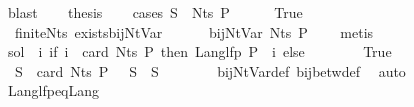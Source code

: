 \begin{isabellebody}
\ blast\isanewline
\ \ \isamarkupfalse%
\ {\isacharquery}{\kern0pt}thesis\isanewline
\ \ \isamarkupfalse%
\ {\isacharparenleft}{\kern0pt}cases\ {\isachardoublequoteopen}S\ {\isasymin}\ Nts\ P{\isachardoublequoteclose}{\isacharparenright}{\kern0pt}\isanewline
\ \ \ \ \isamarkupfalse%
\ True\isanewline
\ \ \ \ \isamarkupfalse%
\ {\isacharasterisk}{\kern0pt}\ finite{\isacharunderscore}{\kern0pt}Nts\ exists{\isacharunderscore}{\kern0pt}bij{\isacharunderscore}{\kern0pt}Nt{\isacharunderscore}{\kern0pt}Var\ \isamarkupfalse%
\ {\isasymgamma}\ {\isasymgamma}{\isacharprime}{\kern0pt}\ \ {\isacharasterisk}{\kern0pt}{\isacharasterisk}{\kern0pt}{\isacharcolon}{\kern0pt}\ {\isachardoublequoteopen}bij{\isacharunderscore}{\kern0pt}Nt{\isacharunderscore}{\kern0pt}Var\ {\isacharparenleft}{\kern0pt}Nts\ P{\isacharparenright}{\kern0pt}\ {\isasymgamma}\ {\isasymgamma}{\isacharprime}{\kern0pt}{\isachardoublequoteclose}\ \isamarkupfalse%
\ metis\isanewline
\isanewline
\ \ \ \ \isamarkupfalse%
\ {\isacharquery}{\kern0pt}sol\ {\isacharequal}{\kern0pt}\ {\isachardoublequoteopen}{\isasymlambda}i{\isachardot}{\kern0pt}\ if\ i\ {\isacharless}{\kern0pt}\ card\ {\isacharparenleft}{\kern0pt}Nts\ P{\isacharparenright}{\kern0pt}\ then\ Lang{\isacharunderscore}{\kern0pt}lfp\ P\ {\isacharparenleft}{\kern0pt}{\isasymgamma}\ i{\isacharparenright}{\kern0pt}\ else\ {\isacharbraceleft}{\kern0pt}{\isacharbraceright}{\kern0pt}{\isachardoublequoteclose}\isanewline
\ \ \ \ \isamarkupfalse%
\ {\isacharasterisk}{\kern0pt}{\isacharasterisk}{\kern0pt}\ True\ \isamarkupfalse%
\ {\isachardoublequoteopen}{\isasymgamma}{\isacharprime}{\kern0pt}\ S\ {\isacharless}{\kern0pt}\ card\ {\isacharparenleft}{\kern0pt}Nts\ P{\isacharparenright}{\kern0pt}{\isachardoublequoteclose}\ {\isachardoublequoteopen}{\isasymgamma}\ {\isacharparenleft}{\kern0pt}{\isasymgamma}{\isacharprime}{\kern0pt}\ S{\isacharparenright}{\kern0pt}\ {\isacharequal}{\kern0pt}\ S{\isachardoublequoteclose}\isanewline
\ \ \ \ \ \ \isamarkupfalse%
\ bij{\isacharunderscore}{\kern0pt}Nt{\isacharunderscore}{\kern0pt}Var{\isacharunderscore}{\kern0pt}def\ bij{\isacharunderscore}{\kern0pt}betw{\isacharunderscore}{\kern0pt}def\ \isamarkupfalse%
\ auto\isanewline
\ \ \ \ \isamarkupfalse%
\ Lang{\isacharunderscore}{\kern0pt}lfp{\isacharunderscore}{\kern0pt}eq{\isacharunderscore}{\kern0pt}Lang\ \isamarkupfalse%

\end{isabellebody}
